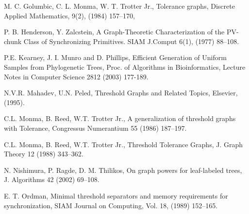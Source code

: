 \documentclass{elsarticle}
\begin{document}
\begin{thebibliography}{00}
\begin{small}
M. C. Golumbic, C. L. Monma, W. T. Trotter Jr., Tolerance graphs, Discrete Applied Mathematics, 9(2), (1984) 157--170,

P. B. Henderson, Y. Zalcstein, A Graph-Theoretic Characterization of
the PV-chunk Class of Synchronizing Primitives. SIAM J.Comput 6(1), (1977) 88--108.

P.E. Kearney, J. I. Munro and D. Phillips, Efficient Generation of Uniform Samples from Phylogenetic Trees, Proc. of Algorithms in Bioinformatics, Lecture Notes in Computer Science 2812 (2003) 177-189.



N.V.R. Mahadev, U.N. Peled, Threshold Graphs and Related Topics, Elsevier, (1995).

C.L. Monma, B. Reed, W.T. Trotter Jr., A generalization of threshold graphs with Tolerance, Congressus Numerantium 55 (1986) 187--197.

C.L. Monma, B. Reed, W.T. Trotter Jr., Threshold Tolerance Graphs, J. Graph Theory 12 (1988) 343--362.

N. Nishimura,  P. Ragde,  D. M. Thilikos, On graph powers for leaf-labeled trees,  J. Algorithms 42 (2002) 69--108.

E. T. Ordman, Minimal threshold separators and memory requirements
for synchronization, SIAM Journal on Computing, Vol. 18, (1989)  152--165.




\end{small}
\end{thebibliography}
\end{document}
